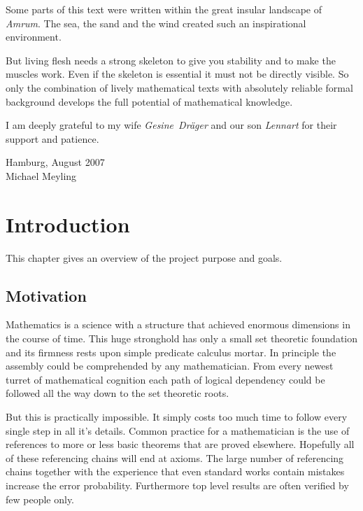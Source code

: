 \documentclass[a4paper,german,10pt,twoside]{book}
\theoremstyle{definition}
\theoremstyle{remark}
\begin{document}
\par
Some parts of this text were written within the great insular landscape of \emph{Amrum}. The sea, the sand and the wind created such an inspirational environment.

\par
But living flesh needs a strong skeleton to give you stability and to make the muscles work. Even if the skeleton is essential it must not be directly visible.
So only the combination of lively mathematical texts with absolutely reliable formal background develops the full potential of mathematical knowledge.

\par
I am deeply grateful to my wife \emph{Gesine~Dr{\"a}ger} and our son \emph{Lennart} for their support and patience.
\par
\vspace*{1cm} Hamburg, August 2007 \\
\hspace*{\fill} Michael Meyling


\chapter{Introduction\label{ch:introduction}} \label{chapter2} \hypertarget{chapter2}{}

This chapter gives an overview of the project purpose and goals.

\section{Motivation} \label{chapter2_section0} \hypertarget{chapter2_section0}{}
Mathematics is a science with a structure that achieved enormous dimensions in the course of time. This huge stronghold has only a small set theoretic foundation and its firmness rests upon simple predicate calculus mortar. In principle the assembly could be comprehended by any mathematician. From every newest turret of mathematical cognition each path of logical dependency could be followed all the way down to the set theoretic roots.

\par
But this is practically impossible. It simply costs too much time to follow every single step in all it's details. Common practice for a mathematician is the use of references to more or less basic theorems that are proved elsewhere. Hopefully all of these referencing chains will end at axioms. The large number of referencing chains together with the experience that even standard works contain mistakes increase the error probability. Furthermore top level results are often verified by few people only.
\end{document}
